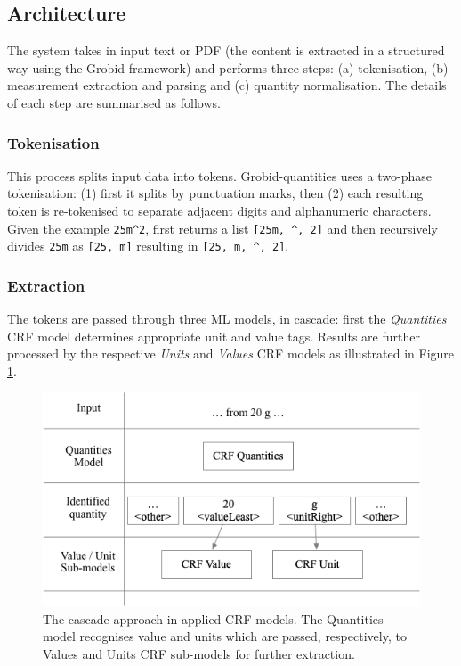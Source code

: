 \documentclass[sigconf]{acmart}
\begin{document}
\subsection{Architecture}
The system takes in input text or PDF (the content is extracted in a structured way using the Grobid framework) and performs three steps: (a) tokenisation, (b) measurement extraction and parsing and (c) quantity normalisation. The details of each step are summarised as follows. 

\subsubsection{Tokenisation}
This process splits input data into tokens. Grobid-quantities uses a two-phase tokenisation: (1) first it splits by punctuation marks, then (2) each resulting token is re-tokenised to separate adjacent digits and alphanumeric characters. Given the example \texttt{25m\^{}2}, first returns a list \texttt{[25m, \^{}, 2]} and then recursively divides \texttt{25m} as \texttt{[25, m]}  resulting in \texttt{[25, m, \^{}, 2]}.

\subsubsection{Extraction}
The tokens are passed through three ML models, in cascade: first the \textit{Quantities} CRF model determines appropriate unit and value tags. Results are further processed by the respective \textit{Units} and \textit{Values} CRF models as illustrated in Figure \ref{fig:schema-cascade}.  

\begin{figure}[ht]
  \centering
  \includegraphics[width=\linewidth]{images/schema-cascade}
  \caption{The cascade approach in applied CRF models. The Quantities model recognises value and units which are passed, respectively, to Values and Units CRF sub-models for further extraction.}
  \label{fig:schema-cascade}
\end{figure}
\end{document}
